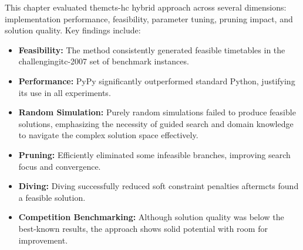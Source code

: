 This chapter evaluated the\ac{mcts}-\ac{hc} hybrid approach across several dimensions: implementation performance, feasibility, parameter tuning, pruning impact, and solution quality. Key findings include:

\begin{itemize}
\item \textbf{Feasibility:} The method consistently generated feasible timetables in the challenging\ac{itc-2007} set of benchmark instances.

\item \textbf{Performance:} PyPy significantly outperformed standard Python, justifying its use in all experiments.

\item \textbf{Random Simulation:} Purely random simulations failed to produce feasible solutions, emphasizing the necessity of guided search and domain knowledge to navigate the complex solution space effectively.

\item \textbf{Pruning:} Efficiently eliminated some infeasible branches, improving search focus and convergence.

\item \textbf{Diving:} Diving successfully reduced soft constraint penalties after\ac{mcts} found a feasible solution.

\item \textbf{Competition Benchmarking:} Although solution quality was below the best-known results, the approach shows solid potential with room for improvement.
\end{itemize}